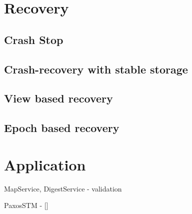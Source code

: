 \section{Recovery}

\subsection{Crash Stop}

\subsection{Crash-recovery with stable storage}

\subsection{View based recovery}

\subsection{Epoch based recovery}

\section{Application}
MapService, DigestService - validation

PaxosSTM - []

